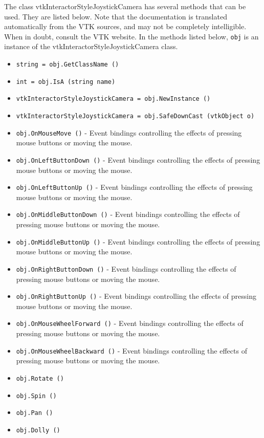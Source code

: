 The class vtkInteractorStyleJoystickCamera has several methods that can be used.
  They are listed below.
Note that the documentation is translated automatically from the VTK sources,
and may not be completely intelligible.  When in doubt, consult the VTK website.
In the methods listed below, \verb|obj| is an instance of the vtkInteractorStyleJoystickCamera class.
\begin{itemize}
\item  \verb|string = obj.GetClassName ()|

\item  \verb|int = obj.IsA (string name)|

\item  \verb|vtkInteractorStyleJoystickCamera = obj.NewInstance ()|

\item  \verb|vtkInteractorStyleJoystickCamera = obj.SafeDownCast (vtkObject o)|

\item  \verb|obj.OnMouseMove ()| -  Event bindings controlling the effects of pressing mouse buttons
 or moving the mouse.

\item  \verb|obj.OnLeftButtonDown ()| -  Event bindings controlling the effects of pressing mouse buttons
 or moving the mouse.

\item  \verb|obj.OnLeftButtonUp ()| -  Event bindings controlling the effects of pressing mouse buttons
 or moving the mouse.

\item  \verb|obj.OnMiddleButtonDown ()| -  Event bindings controlling the effects of pressing mouse buttons
 or moving the mouse.

\item  \verb|obj.OnMiddleButtonUp ()| -  Event bindings controlling the effects of pressing mouse buttons
 or moving the mouse.

\item  \verb|obj.OnRightButtonDown ()| -  Event bindings controlling the effects of pressing mouse buttons
 or moving the mouse.

\item  \verb|obj.OnRightButtonUp ()| -  Event bindings controlling the effects of pressing mouse buttons
 or moving the mouse.

\item  \verb|obj.OnMouseWheelForward ()| -  Event bindings controlling the effects of pressing mouse buttons
 or moving the mouse.

\item  \verb|obj.OnMouseWheelBackward ()| -  Event bindings controlling the effects of pressing mouse buttons
 or moving the mouse.

\item  \verb|obj.Rotate ()|

\item  \verb|obj.Spin ()|

\item  \verb|obj.Pan ()|

\item  \verb|obj.Dolly ()|

\end{itemize}
